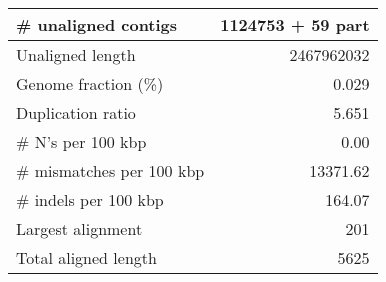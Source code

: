 \documentclass[12pt,a4paper]{article}
\begin{document}
\begin{table}[ht]
\begin{center}
\begin{tabular}{|l*{1}{|r}|}
\# unaligned contigs & 1124753 + 59 part \\ \hline
Unaligned length & 2467962032 \\ \hline
Genome fraction (\%) & 0.029 \\ \hline
Duplication ratio & 5.651 \\ \hline
\# N's per 100 kbp & 0.00 \\ \hline
\# mismatches per 100 kbp & 13371.62 \\ \hline
\# indels per 100 kbp & 164.07 \\ \hline
Largest alignment & 201 \\ \hline
Total aligned length & 5625 \\ \hline
\end{tabular}
\end{center}
\end{table}
\end{document}
